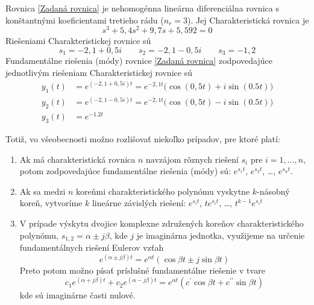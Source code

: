 \documentclass[a4paper, 10pt, ]{article}
\begin{document}
Rovnica \eqref{Zadaná rovnica} je nehomogénna lineárna diferenciálna rovnica s konštantnými koeficientami tretieho rádu ($n_r = 3$). Jej Charakteristická rovnica je
\begin{equation}
	s^3 + 5,4 s^2 + 9,7 s + 5,592 = 0
\end{equation}
Riešeniami Charakteristickej rovnice sú
\begin{equation} \label{Korene CHR}
		s_1 = -2,1 + 0,5i \qquad
		s_2 = -2,1 - 0,5i \qquad
		s_3 = -1,2
\end{equation}
Fundamentálne riešenia (módy) rovnice \eqref{Zadaná rovnica} zodpovedajúce jednotlivým riešeniam Charakteristickej rovnice sú
\begin{subequations}
	\begin{align}
		y_1(t) &= e^{(-2,1 + 0,5i)t} = e^{-2,1t} \big({ \cos(0,5t) + i\sin(0.5t) }\big) \\
		y_2(t) &= e^{(-2,1 - 0,5i)t} = e^{-2,1t} \big({ \cos(0,5t) - i\sin(0.5t) }\big) \\
		y_3(t) &= e^{-1.2t}
	\end{align}
\end{subequations}




%




Totiž, vo všeobecnosti možno rozlišovať niekoľko prípadov, pre ktoré platí:
\begin{enumerate}
    \item Ak má charakteristická rovnica $n$ navzájom rôznych riešení $s_i$ pre $i = 1, \ldots, n$, potom zodpovedajúce fundamentálne riešenia (módy) sú: $e^{s_1 t}$, $e^{s_2 t}$, \ldots, $e^{s_n t}$.
    \item Ak sa medzi $n$ koreňmi charakteristického polynómu vyskytne $k$-násobný koreň, vytvoríme $k$ lineárne závislých riešení: $e^{s_i t}$, $t e^{s_i t}$, \ldots, $t^{k-1} e^{s_i t}$
    \item V prípade výskytu dvojice komplexne združených koreňov charakteristického polynómu, $s_{1,2} = \alpha \pm j \beta$, kde $j$ je imaginárna jednotka, využijeme na určenie fundamentálnych riešení Eulerov vzťah
    \begin{equation}
        e^{\left(\alpha \pm j \beta\right)t} = e^{\alpha t} \left( \cos\beta t \pm j \sin \beta t\right)
    \end{equation}
    Preto potom možno písať príslušné fundamentálne riešenie v tvare
    \begin{equation}
        c_1 e^{\left(\alpha + j \beta\right)t} + c_2 e^{\left(\alpha - j \beta\right)t} = e^{\alpha t} \left( c^\prime \cos\beta t + c^{\prime\prime} \sin \beta t\right)
    \end{equation}
    kde sú imaginárne časti nulové.
\end{enumerate}
\end{document}
